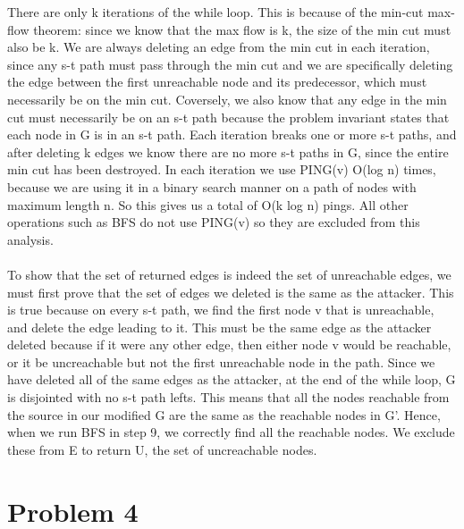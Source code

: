 \documentclass{article}
\begin{document}
There are only k iterations of the while loop. This is because of the min-cut max-flow theorem: since we know that the max flow is k, the size of the min cut must also be k. We are always deleting an edge from the min cut in each iteration, since any s-t path must pass through the min cut and we are specifically deleting the edge between the first unreachable node and its predecessor, which must necessarily be on the min cut. Coversely, we also know that any edge in the min cut must necessarily be on an s-t path because the problem invariant states that each node in G is in an s-t path. Each iteration breaks one or more s-t paths, and after deleting k edges we know there are no more s-t paths in G, since the entire min cut has been destroyed. In each iteration we use PING(v) O(log n) times, because we are using it in a binary search manner on a path of nodes with maximum length n. So this gives us a total of O(k log n) pings. All other operations such as BFS do not use PING(v) so they are excluded from this analysis.\\
\\
To show that the set of returned edges is indeed the set of unreachable edges, we must first prove that the set of edges we deleted is the same as the attacker. This is true because on every s-t path, we find the first node v that is unreachable, and delete the edge leading to it. This must be the same edge as the attacker deleted because if it were any other edge, then either node v would be reachable, or it be uncreachable but not the first unreachable node in the path. Since we have deleted all of the same edges as the attacker, at the end of the while loop, G is disjointed with no s-t path lefts. This means that all the nodes reachable from the source in our modified G are the same as the reachable nodes in G'. Hence, when we run BFS in step 9, we correctly find all the reachable nodes. We exclude these from E to return U, the set of uncreachable nodes.
\\

\section*{Problem 4}
\end{document}
